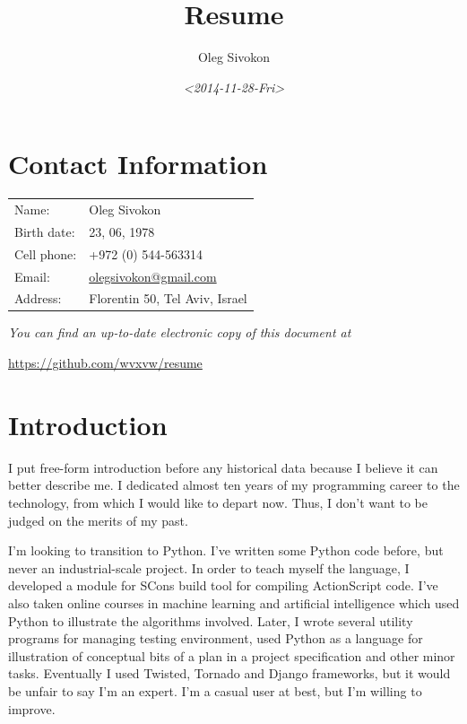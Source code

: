 \documentclass[oneside]{memoir}
\author{Oleg Sivokon}
\date{\textit{<2014-11-28-Fri>}}
\title{Resume}
\begin{document}
\maketitle

\setlength{\parskip}{16pt plus 2pt minus 2pt}

\setcounter{tocdepth}{2}
\tableofcontents

\frontmatter

\chapter{Contact Information}
\label{sec-1}
\begin{center}
\begin{tabular}{ll}
Name: & Oleg Sivokon\\
Birth date: & 23, 06, 1978\\
Cell phone: & +972 (0) 544-563314\\
Email: & \href{mailto:olegsivokon@gmail.com}{olegsivokon@gmail.com}\\
Address: & Florentin 50, Tel Aviv, Israel\\
\end{tabular}
\end{center}

\emph{You can find an up-to-date electronic copy of this document at}

\url{https://github.com/wvxvw/resume}
\chapter{Introduction}
\label{sec-2}
I put free-form introduction before any historical data because I believe it
can better describe me.  I dedicated almost ten years of my programming career
to the technology, from which I would like to depart now.  Thus, I don't want
to be judged on the merits of my past.

I'm looking to transition to Python.  I've written some Python code before,
but never an industrial-scale project.  In order to teach myself the language,
I developed a module for SCons build tool for compiling ActionScript code.
I've also taken online courses in machine learning and artificial intelligence
which used Python to illustrate the algorithms involved.  Later, I wrote
several utility programs for managing testing environment, used Python as a
language for illustration of conceptual bits of a plan in a project
specification and other minor tasks.  Eventually I used Twisted, Tornado and
Django frameworks, but it would be unfair to say I'm an expert.  I'm a casual
user at best, but I'm willing to improve.
\end{document}
